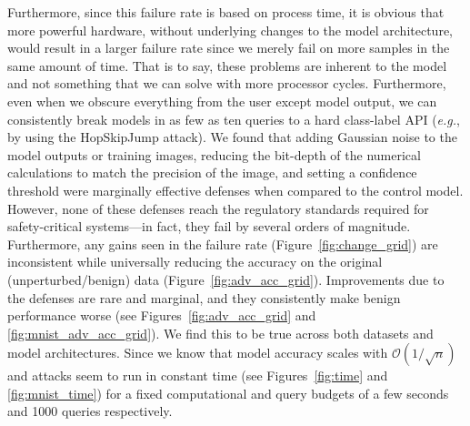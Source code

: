 \documentclass[journal]{IEEEtran}
\newcommand{\eg}{\textit{e.g.}\xspace}
\newcommand{\cm}[1]{\textit{{\color{blue}#1}}}
\begin{document}
Furthermore, since this failure rate is based on process time, it is obvious that more powerful hardware, without underlying changes to the model architecture, would result in a larger failure rate since we merely fail on more samples in the same amount of time. That is to say, these problems are inherent to the model and not something that we can solve with more processor cycles. Furthermore, even when we obscure everything from the user except model output, we can consistently break models in as few as ten queries to a hard class-label API (\eg, by using the HopSkipJump attack). We found that adding Gaussian noise to the model outputs or training images, reducing the bit-depth of the numerical calculations to match the precision of the image, and setting a confidence threshold were marginally effective defenses when compared to the control model. However, none of these defenses reach the regulatory standards required for safety-critical systems---in fact, they fail by several orders of magnitude. Furthermore, any gains seen in the failure rate (Figure~\ref{fig:change_grid}) are inconsistent while universally reducing the accuracy on the original (unperturbed/benign) data (Figure~\ref{fig:adv_acc_grid}). Improvements due to the defenses are rare and marginal, and they consistently make benign performance worse (see Figures~\ref{fig:adv_acc_grid} and \ref{fig:mnist_adv_acc_grid}). We find this to be true across both datasets and model architectures. Since we know that model accuracy scales with $\mathcal{O}(1/\sqrt{n})$~\cite{vapnik1994measuring} and attacks seem to run in constant time (see Figures~\ref{fig:time} and \ref{fig:mnist_time}) for a fixed computational and query budgets of a few seconds and 1000 queries respectively. 
\end{document}
